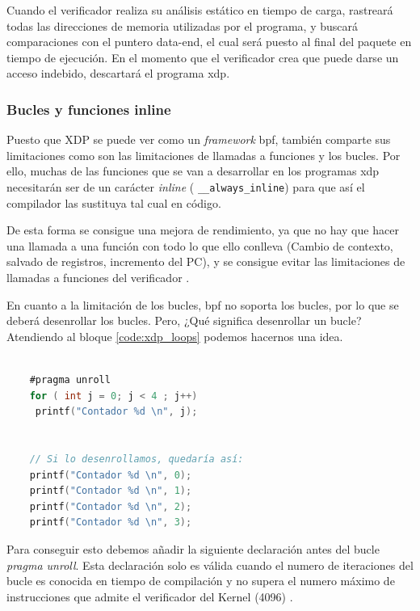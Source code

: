 Cuando el verificador realiza su análisis estático en tiempo de carga, rastreará todas las direcciones de memoria utilizadas por el programa, y buscará comparaciones con el puntero data-end, el cual será puesto al final del paquete en tiempo de ejecución. En el momento que el verificador crea que puede darse un acceso indebido, descartará el programa \gls{xdp}.


\subsubsection{Bucles y funciones inline}

Puesto que XDP se puede ver como un \textit{framework} \gls{bpf}, también comparte sus limitaciones como son las limitaciones de llamadas a funciones y los bucles. Por ello, muchas de las funciones que se van a desarrollar en los programas \gls{xdp} necesitarán ser de un carácter \textit{inline} ( \texttt{\_\_always\_inline}) para que así el compilador las sustituya tal cual en código.\\
\par
De esta forma se consigue una mejora de rendimiento, ya que no hay que hacer una llamada a una función con todo lo que ello conlleva (Cambio de contexto, salvado de registros, incremento del PC), y se consigue evitar las limitaciones de llamadas a funciones del verificador \cite{xdp2}.\\
\par

En cuanto a la limitación de los bucles, \gls{bpf} no soporta los bucles, por lo que se deberá desenrollar los bucles. Pero, ¿Qué significa desenrollar un bucle? Atendiendo al bloque \ref{code:xdp_loops} podemos hacernos una idea. 

\begin{lstlisting}[language=C, style=C-color, caption={Loops Unrolling},label=code:xdp_loops]

    #pragma unroll
    for ( int j = 0; j < 4 ; j++)
     printf("Contador %d \n", j);
    
    
    // Si lo desenrollamos, quedaría así:
    printf("Contador %d \n", 0);
    printf("Contador %d \n", 1);
    printf("Contador %d \n", 2);
    printf("Contador %d \n", 3);

\end{lstlisting}
\vspace{0.5cm}

Para conseguir esto debemos añadir la siguiente declaración antes del bucle \textit{pragma unroll}. Esta declaración solo es válida cuando el numero de iteraciones del bucle es conocida en tiempo de compilación y no supera el numero máximo de instrucciones que admite el verificador del Kernel (4096) \cite{xdp1}.
